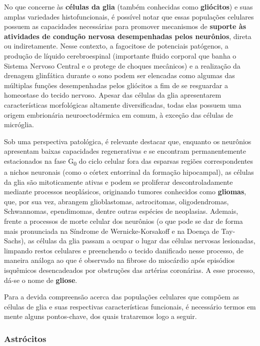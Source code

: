 \documentclass[
]{book}
\theoremstyle{definition}
\theoremstyle{definition}
\theoremstyle{definition}
\theoremstyle{definition}
\theoremstyle{remark}
\begin{document}
No que concerne às \textbf{células da glia} (também conhecidas como \textbf{gliócitos}) e suas amplas variedades histofuncionais, é possível notar que essas populações celulares possuem as capacidades necessárias para promover mecanismos de \textbf{suporte às atividades de condução nervosa desempenhadas pelos neurônios}, direta ou indiretamente. Nesse contexto, a fagocitose de potenciais patógenos, a produção de líquido cerebroespinal (importante fluido corporal que banha o Sistema Nervoso Central e o protege de choques mecânicos) e a realização da drenagem glinfática durante o sono podem ser elencadas como algumas das múltiplas funções desempenhadas pelos gliócitos a fim de se resguardar a homeostase do tecido nervoso. Apesar das células da glia apresentarem características morfológicas altamente diversificadas, todas elas possuem uma origem embrionária neuroectodérmica em comum, à exceção das células de micróglia.

Sob uma perspectiva patológica, é relevante destacar que, enquanto os neurônios apresentam baixas capacidades regenerativas e se encontram permanentemente estacionados na fase G\textsubscript{0} do ciclo celular fora das esparsas regiões correspondentes a nichos neuronais (como o córtex entorrinal da formação hipocampal), as células da glia são mitoticamente ativas e podem se proliferar descontroladamente mediante processos neoplásicos, originando tumores conhecidos como \textbf{gliomas}, que, por sua vez, abrangem glioblastomas, astrocitomas, oligodendromas, Schwannomas, ependimomas, dentre outras espécies de neoplasias. Ademais, frente a processos de morte celular dos neurônios (o que pode se dar de forma mais pronunciada na Síndrome de Wernicke-Korsakoff e na Doença de Tay-Sachs), as células da glia passam a ocupar o lugar das células nervosas lesionadas, limpando restos celulares e preenchendo o tecido danificado nesse processo, de maneira análoga ao que é observado na fibrose do miocárdio após episódios isquêmicos desencadeados por obstruções das artérias coronárias. A esse processo, dá-se o nome de \textbf{gliose}.

Para a devida compreensão acerca das populações celulares que compõem as células de glia e suas respectivas características funcionais, é necessário termos em mente alguns pontos-chave, dos quais trataremos logo a seguir.

\hypertarget{astruxf3citos}{%
\subsubsection*{Astrócitos}\label{astruxf3citos}}
\end{document}
